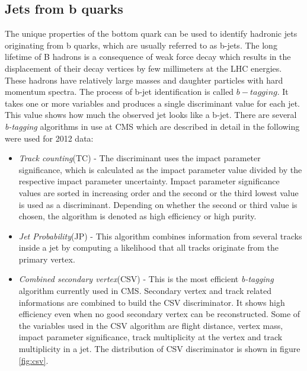 \subsection{Jets from b quarks}
\label{sec:btagging}

The unique properties of the bottom quark can be used to identify hadronic jets originating from b quarks, which are usually referred to as b-jets. The long lifetime of B hadrons is a consequence of weak force decay which results in the displacement of their decay vertices by few millimeters at the LHC energies. These hadrons have relatively large masses and daughter particles with hard momentum spectra. The process of b-jet identification is called $b-tagging$. It takes one or more variables and produces a single discriminant value for each jet. This value shows how much the observed jet looks like a b-jet. There are several \textit{b-tagging} algorithms in use at CMS which are described in detail in \cite{Chatrchyan:2012jua} the following were used for 2012 data:
\begin{itemize}
	\item \textit{Track counting}(TC) - The discriminant uses the impact parameter significance, which is calculated as the impact parameter value divided by the respective impact parameter uncertainty. Impact parameter significance values are sorted in increasing order and the second or the third lowest value is used as a discriminant. Depending on whether the second or third value is chosen, the algorithm is denoted as high efficiency or high purity. 
	\item \textit{Jet Probability}(JP) - This algorithm combines information from several tracks inside a jet by computing a likelihood that all tracks originate from the primary vertex.  
	\item \textit{Combined secondary vertex}(CSV) - This is the most efficient \textit{b-tagging} algorithm currently used in CMS. Secondary vertex and track related informations are combined to build the CSV discriminator. It shows high efficiency even when no good secondary vertex can be reconstructed. Some of the variables used in the CSV algorithm are flight distance, vertex mass, impact parameter significance, track multiplicity at the vertex and track multiplicity in a jet. The distribution of CSV discriminator is shown in figure \ref{fig:csv}.
\end{itemize}
